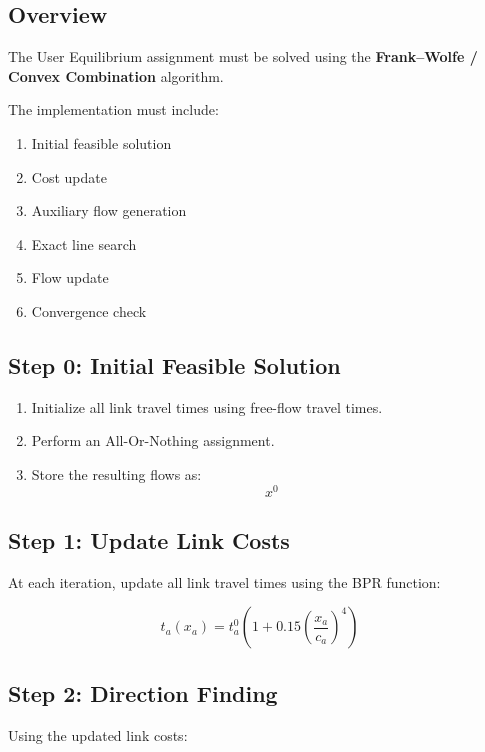 \documentclass{rapportCS} %
\begin{document}
\subsection{Overview}

The User Equilibrium assignment must be solved using the \textbf{Frank--Wolfe / Convex Combination} algorithm.

The implementation must include:

\begin{enumerate}
    \item Initial feasible solution
    \item Cost update
    \item Auxiliary flow generation
    \item Exact line search
    \item Flow update
    \item Convergence check
\end{enumerate}

\subsection{Step 0: Initial Feasible Solution}

\begin{enumerate}
    \item Initialize all link travel times using free-flow travel times.
    \item Perform an All-Or-Nothing assignment.
    \item Store the resulting flows as:
\[
x^0
\]
\end{enumerate}

\subsection{Step 1: Update Link Costs}

At each iteration, update all link travel times using the BPR function:

\[
t_a(x_a)=t_a^0\left(1+0.15\left(\frac{x_a}{c_a}\right)^4\right)
\]

\subsection{Step 2: Direction Finding}

Using the updated link costs:
\end{document}

